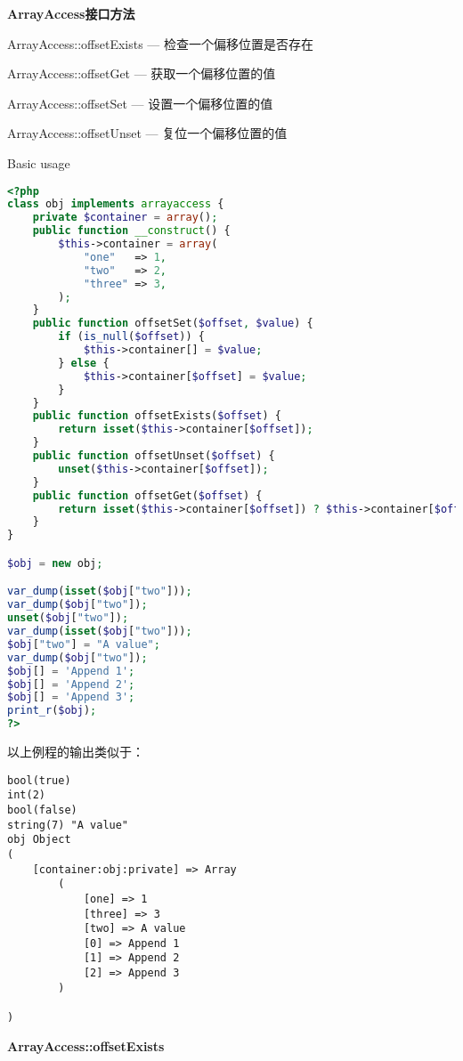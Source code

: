 \textbf{ArrayAccess接口方法}

\begin{compactitem}
\item ArrayAccess::offsetExists — 检查一个偏移位置是否存在
\item ArrayAccess::offsetGet — 获取一个偏移位置的值
\item ArrayAccess::offsetSet — 设置一个偏移位置的值
\item ArrayAccess::offsetUnset — 复位一个偏移位置的值
\end{compactitem}


\begin{example}
Basic usage
\begin{lstlisting}[language=PHP]
<?php
class obj implements arrayaccess {
    private $container = array();
    public function __construct() {
        $this->container = array(
            "one"   => 1,
            "two"   => 2,
            "three" => 3,
        );
    }
    public function offsetSet($offset, $value) {
        if (is_null($offset)) {
            $this->container[] = $value;
        } else {
            $this->container[$offset] = $value;
        }
    }
    public function offsetExists($offset) {
        return isset($this->container[$offset]);
    }
    public function offsetUnset($offset) {
        unset($this->container[$offset]);
    }
    public function offsetGet($offset) {
        return isset($this->container[$offset]) ? $this->container[$offset] : null;
    }
}

$obj = new obj;

var_dump(isset($obj["two"]));
var_dump($obj["two"]);
unset($obj["two"]);
var_dump(isset($obj["two"]));
$obj["two"] = "A value";
var_dump($obj["two"]);
$obj[] = 'Append 1';
$obj[] = 'Append 2';
$obj[] = 'Append 3';
print_r($obj);
?>
\end{lstlisting}
\end{example}


以上例程的输出类似于：

\begin{verbatim}
bool(true)
int(2)
bool(false)
string(7) "A value"
obj Object
(
    [container:obj:private] => Array
        (
            [one] => 1
            [three] => 3
            [two] => A value
            [0] => Append 1
            [1] => Append 2
            [2] => Append 3
        )

)
\end{verbatim}



\textbf{ArrayAccess::offsetExists}

